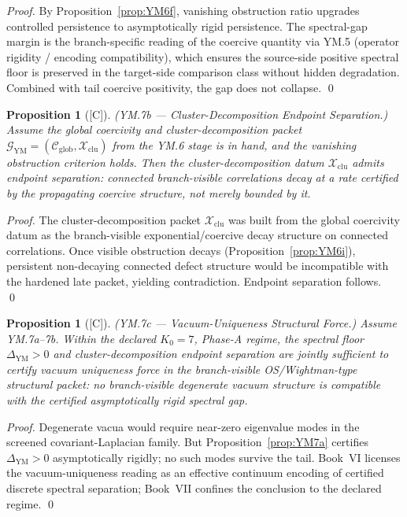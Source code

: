 \documentclass[12pt,oneside]{amsbook}
\theoremstyle{plain}
\newtheorem{proposition}[theorem]{Proposition}
\theoremstyle{definition}
\theoremstyle{remark}
\newcommand{\status}[1]{\textup{[#1]}}
\begin{document}
\begin{proof}
By Proposition~\ref{prop:YM6f}, vanishing obstruction ratio upgrades
controlled persistence to asymptotically rigid persistence. The
spectral-gap margin is the branch-specific reading of the coercive
quantity via YM.5 (operator rigidity / encoding compatibility), which
ensures the source-side positive spectral floor is preserved in the
target-side comparison class without hidden degradation. Combined
with tail coercive positivity, the gap does not collapse. \qed
\end{proof}

\begin{proposition}[\status{C}]\label{prop:YM7b}
\textup{(YM.7b --- Cluster-Decomposition Endpoint Separation.)}
Assume the global coercivity and cluster-decomposition packet
$\mathcal{G}_{\mathrm{YM}} = (\mathcal{C}_{\mathrm{glob}},
\mathcal{X}_{\mathrm{clu}})$ from the YM.6 stage is in hand, and the
vanishing obstruction criterion holds. Then the
cluster-decomposition datum $\mathcal{X}_{\mathrm{clu}}$ admits
endpoint separation: connected branch-visible correlations decay at a
rate certified by the propagating coercive structure, not merely
bounded by it.
\end{proposition}

\begin{proof}
The cluster-decomposition packet $\mathcal{X}_{\mathrm{clu}}$ was
built from the global coercivity datum as the branch-visible
exponential/coercive decay structure on connected correlations. Once
visible obstruction decays (Proposition~\ref{prop:YM6i}), persistent
non-decaying connected defect structure would be incompatible with the
hardened late packet, yielding contradiction. Endpoint separation
follows. \qed
\end{proof}

\begin{proposition}[\status{C}]\label{prop:YM7c}
\textup{(YM.7c --- Vacuum-Uniqueness Structural Force.)}
Assume YM.7a--7b. Within the declared $K_0=7$, Phase-A regime, the
spectral floor $\Delta_{\mathrm{YM}} > 0$ and cluster-decomposition
endpoint separation are jointly sufficient to certify vacuum
uniqueness force in the branch-visible OS/Wightman-type structural
packet: no branch-visible degenerate vacuum structure is compatible
with the certified asymptotically rigid spectral gap.
\end{proposition}

\begin{proof}
Degenerate vacua would require near-zero eigenvalue modes in the
screened covariant-Laplacian family. But Proposition~\ref{prop:YM7a}
certifies $\Delta_{\mathrm{YM}} > 0$ asymptotically rigidly; no such
modes survive the tail. Book~VI licenses the vacuum-uniqueness
reading as an effective continuum encoding of certified discrete
spectral separation; Book~VII confines the conclusion to the declared
regime. \qed
\end{proof}
\end{document}
